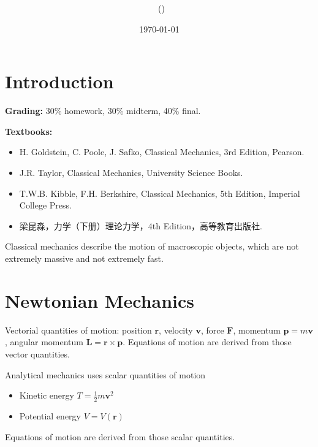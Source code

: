 \documentclass[twoside,11pt]{article}
\title{{\lms \Code \ \Ass}}
\author{\lms \name \ (\href{mailto:\mail}{\mail})}
\date{\lms \today}
\makeatletter
\theoremstyle{definition}
\theoremstyle{remark}
\newtheorem*{remark}{Remark}
\renewcommand{\maketitle}{\bgroup\setlength{\parindent}{0pt}
\begin{flushleft}
  \textbf{\Large\@title}

  \@author
\end{flushleft}\egroup
}
\makeatother
\begin{document}
\maketitle
\thispagestyle{title}



\setcounter{section}{-1}
\section{Introduction}
\textbf{Grading:} 30\% homework, 30\% midterm, 40\% final.

\textbf{Textbooks:}
\begin{itemize}
    \item H. Goldstein, C. Poole, J. Safko, Classical Mechanics,
    3rd Edition, Pearson.
    \item J.R. Taylor, Classical Mechanics, University Science Books.
    \item T.W.B. Kibble, F.H. Berkshire, Classical Mechanics, 5th Edition,
    Imperial College Press.
    \item 梁昆淼，力学（下册）理论力学，4th Edition，高等教育出版社.
\end{itemize}

Classical mechanics describe the motion of macroscopic objects, which are
not extremely massive and not extremely fast.

\section{Newtonian Mechanics}
Vectorial quantities of motion: position $\mathbf{r}$, 
velocity $\mathbf{v}$, force $\mathbf{F}$,
momentum $\mathbf{p}=m\mathbf{v}$,
angular momentum $\mathbf{L}=\mathbf{r}\times\mathbf{p}$.
Equations of motion are derived from those vector quantities.

Analytical mechanics uses scalar quantities of motion
\begin{itemize}
    \item Kinetic energy $T = \frac{1}{2}m\mathbf{v}^2$
    \item Potential energy $V = V(\mathbf{r})$
\end{itemize}
Equations of motion are derived from those scalar quantities.
\end{document}
